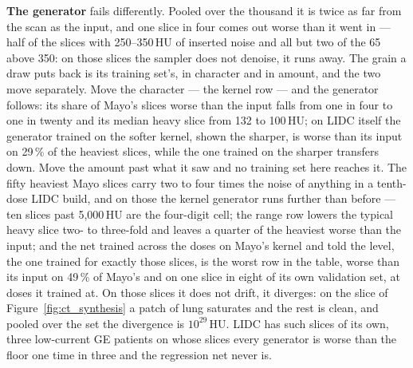 \medskip\noindent \textbf{The generator} fails differently. Pooled over
the thousand it is twice as far from the scan as the input, and one slice
in four comes out worse than it went in --- half of
the slices with 250--350\,HU of inserted noise and all but two of the 65
above 350: on those slices the sampler does not denoise, it runs away.
The grain a draw puts back is its training set's, in character and in
amount, and the two move separately. Move the character --- the kernel row
--- and the generator follows: its share of Mayo's slices worse than the
input falls from one in four to one in twenty and its median heavy slice
from 132 to 100\,HU; on LIDC itself the generator trained on the softer
kernel, shown the sharper, is worse than its input on 29\,\% of the heaviest
slices, while the one trained on the sharper transfers down. Move the
amount past what it saw and no training set here reaches it. The fifty
heaviest Mayo slices carry two to four times the noise of anything in a
tenth-dose LIDC build, and on those the kernel generator runs further than
before --- ten slices past 5,000\,HU are the four-digit cell; the range row
lowers the typical heavy slice two- to three-fold and leaves a quarter of
the heaviest worse than the input; and the net trained across the doses on
Mayo's kernel and told the level, the one trained for exactly those slices,
is the worst row in the table, worse than its input on 49\,\% of Mayo's
and on one slice in eight of its own validation set, at doses it trained
at. On those slices it does not drift, it diverges: on the slice of
Figure~\ref{fig:ct_synthesis} a patch of lung saturates and the rest is
clean, and pooled over the set the divergence is $10^{29}$\,HU. LIDC has
such slices of its own, three low-current GE patients on whose slices
every generator is worse than the floor one time in three and the
regression net never is.

